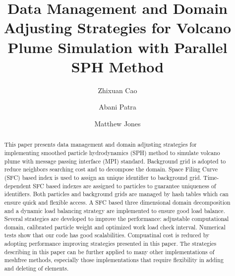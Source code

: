 \documentclass[procedia]{easychair}
\title{Data Management and Domain Adjusting Strategies for Volcano Plume Simulation with Parallel SPH Method}
\author{
    Zhixuan Cao\inst{1}%
\and
    Abani Patra\inst{1}
\and
    Matthew Jones\inst{2}%
}
\institute{
Department of MAE,
University at Buffalo, Buffalo, New York, U.S.A.\\
\and
Center for Computational Research,
University at Buffalo, Buffalo, New York, U.S.A.\\
 }
\begin{document}
\maketitle


\begin{abstract}
This paper presents data management and domain adjusting strategies for implementing smoothed particle hydrodynamics (SPH) method to simulate volcano plume with message passing interface (MPI) standard. 
Background grid is adopted to reduce neighbors searching cost and to decompose the domain. Space Filing Curve (SFC) based index is used to assign an unique identifier to background grid. Time-dependent SFC based indexes are assigned to particles to guarantee uniqueness of identifiers.  
Both particles and background grids are managed by hash tables which can ensure quick and flexible access.
A SFC based three dimensional domain decomposition and a dynamic load balancing strategy are implemented to ensure good load balance. 
Several strategies are developed to improve the performance: adjustable computational domain, calibrated particle weight and optimized work load check interval. 
Numerical tests show that our code has good scalabilities. Compuatinal cost is reduced by adopting performance improving strategies presented in this paper. 
The strategies describing in this paper can be further applied to many other implementations of meshfree methods, especially those implementations that require flexibility in adding and deleting of elements.
\end{abstract}


%
%


\end{document}
